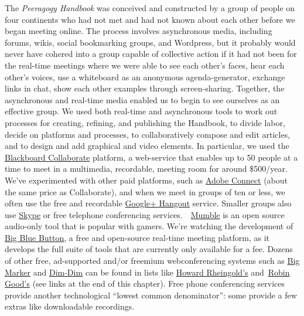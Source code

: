 The \emph{Peeragogy Handbook} was conceived and constructed by a group
of people on four continents who had not met and had not known about
each other before we began meeting online. The process involves
asynchronous media, including forums, wikis, social bookmarking groups,
and Wordpress, but it probably would never have cohered into a group
capable of collective action if it had not been for the real-time
meetings where we were able to see each other's faces, hear each other's
voices, use a whiteboard as an anonymous agenda-generator, exchange
links in chat, show each other examples through screen-sharing.
Together, the asynchronous and real-time media enabled us to begin to
see ourselves as an effective group. We used both real-time and
asynchronous tools to work out processes for creating, refining, and
publishing the Handbook, to divide labor, decide on platforms and
processes, to collaboratively compose and edit articles, and to design
and add graphical and video elements. In particular, we used the
\href{http://www.blackboard.com/platforms/collaborate/overview.aspx}{Blackboard
Collaborate} platform, a web-service that enables up to 50 people at a
time to meet in a multimedia, recordable, meeting room for around
\$500/year. We've experimented with other paid platforms, such as
\href{http://success.adobe.com/en/na/sem/products/connect/1109_6011_connect_webinars.html}{Adobe
Connect} (about the same price as Collaborate), and when we meet in
groups of ten or less, we often use the free and recordable
\href{http://www.google.com/+/learnmore/hangouts/}{Google+ Hangout}
service. Smaller groups also use \href{http://www.skype.com}{Skype} or
free telephone conferencing
services.~~\href{http://mumble.sourceforge.net/}{Mumble} is an open
source audio-only tool that is popular with gamers. We're watching the
development of \href{http://www.bigbluebutton.org/}{Big Blue Button}, a
free and open-source real-time meeting platform, as it develops the full
suite of tools that are currently only available for a fee. Dozens of
other free, ad-supported and/or freemium webconferencing systems such as
\href{http://www.bigmarker.com/about}{Big Marker} and
\href{http://www.dimdim.com}{Dim-Dim} can be found in lists like
\href{http://delicious.com/hrheingold/webconferencing}{Howard
Rheingold's} and~\href{http://www.mindmeister.com/12213323/best-online-collaboration-tools-2012-robin-good-s-collaborative-map}{Robin
Good's} (see links at the end of this chapter). Free phone conferencing services provide another technological
``lowest common denominator'': some provide a few extras like
downloadable recordings.

